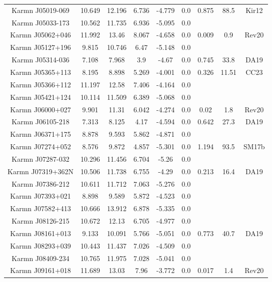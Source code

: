 \begin{longtable}{ccccccccc}
    Karmn J05019-069 & 10.649 & 12.196 & 6.736 & -4.779 & 0.0 & 0.875 & 88.5 & Kir12 \\
    Karmn J05033-173 & 10.562 & 11.735 & 6.936 & -5.095 & 0.0 &  &  &  \\
    Karmn J05062+046 & 11.992 & 13.46 & 8.067 & -4.658 & 0.0 & 0.009 & 0.9 & Rev20 \\
    Karmn J05127+196 & 9.815 & 10.746 & 6.47 & -5.148 & 0.0 &  &  &  \\
    Karmn J05314-036 & 7.108 & 7.968 & 3.9 & -4.67 & 0.0 & 0.745 & 33.8 & DA19 \\
    Karmn J05365+113 & 8.195 & 8.898 & 5.269 & -4.001 & 0.0 & 0.326 & 11.51 & CC23 \\
    Karmn J05366+112 & 11.197 & 12.58 & 7.406 & -4.164 & 0.0 &  &  &  \\
    Karmn J05421+124 & 10.114 & 11.509 & 6.389 & -5.068 & 0.0 &  &  &  \\
    Karmn J06000+027 & 9.901 & 11.31 & 6.042 & -4.274 & 0.0 & 0.02 & 1.8 & Rev20 \\
    Karmn J06105-218 & 7.313 & 8.125 & 4.17 & -4.594 & 0.0 & 0.642 & 27.3 & DA19 \\
    Karmn J06371+175 & 8.878 & 9.593 & 5.862 & -4.871 & 0.0 &  &  &  \\
    Karmn J07274+052 & 8.576 & 9.872 & 4.857 & -5.301 & 0.0 & 1.194 & 93.5 & SM17b \\
    Karmn J07287-032 & 10.296 & 11.456 & 6.704 & -5.26 & 0.0 &  &  &  \\
    Karmn J07319+362N & 10.506 & 11.738 & 6.755 & -4.29 & 0.0 & 0.213 & 16.4 & DA19 \\
    Karmn J07386-212 & 10.611 & 11.712 & 7.063 & -5.276 & 0.0 &  &  &  \\
    Karmn J07393+021 & 8.898 & 9.589 & 5.872 & -4.523 & 0.0 &  &  &  \\
    Karmn J07582+413 & 10.666 & 13.912 & 6.878 & -5.335 & 0.0 &  &  &  \\
    Karmn J08126-215 & 10.672 & 12.13 & 6.705 & -4.977 & 0.0 &  &  &  \\
    Karmn J08161+013 & 9.133 & 10.091 & 5.766 & -5.051 & 0.0 & 0.773 & 40.7 & DA19 \\
    Karmn J08293+039 & 10.443 & 11.437 & 7.026 & -4.509 & 0.0 &  &  &  \\
    Karmn J08409-234 & 10.765 & 11.975 & 7.028 & -5.041 & 0.0 &  &  &  \\
    Karmn J09161+018 & 11.689 & 13.03 & 7.96 & -3.772 & 0.0 & 0.017 & 1.4 & Rev20 \\

\end{longtable}
